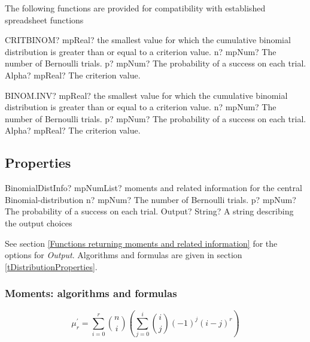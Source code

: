 \vspace{0.3cm}

The following functions are provided for compatibility with established spreadsheet functions

\vspace{0.3cm}
\begin{mpFunctionsExtract}
	\mpWorksheetFunctionThreeNotImplemented
	{CRITBINOM? mpReal? the smallest value for which the cumulative binomial distribution is greater than or equal to a criterion value.}
	{n? mpNum? The number of Bernoulli trials.}
	{p? mpNum? The probability of a success on each trial.}
	{Alpha? mpReal? The criterion value.}
\end{mpFunctionsExtract}

\vspace{0.6cm}
\begin{mpFunctionsExtract}
	\mpWorksheetFunctionThreeNotImplemented
	{BINOM.INV? mpReal? the smallest value for which the cumulative binomial distribution is greater than or equal to a criterion value.}
	{n? mpNum? The number of Bernoulli trials.}
	{p? mpNum? The probability of a success on each trial.}
	{Alpha? mpReal? The criterion value.}
\end{mpFunctionsExtract}




\subsection{Properties}
\label{BinomialDistributionProperties}

\begin{mpFunctionsExtract}
	\mpFunctionThreeNotImplemented
	{BinomialDistInfo? mpNumList? moments and related information for the central Binomial-distribution}
	{n? mpNum? The number of Bernoulli trials.}
	{p? mpNum? The probability of a success on each trial.}
	{Output? String? A string describing the output choices}
\end{mpFunctionsExtract}

\vspace{0.3cm}

See section \ref{Functions returning moments and related information} for the options for {\itshape\sffamily Output}. Algorithms and formulas are given in section \ref{tDistributionProperties}.



\subsubsection{Moments: algorithms and formulas}
\begin{equation} 
	\mu_r^{'} = \sum_{i=0}^r \binom{n}{i} \left(\sum_{j=0}^i \binom{i}{j} (-1)^j (i-j)^r\right)
\end{equation}

